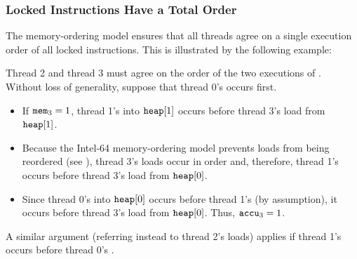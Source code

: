 \newpage

\subsubsection*{Locked Instructions Have a Total Order}

The memory-ordering model ensures that all threads agree on a single execution order of all locked instructions.
This is illustrated by the following example:

\begin{table}[!hbt]
\noindent{}
\caption[Locked Instructions Have a Total Order]{Locked Instructions Have a Total Order \cite[Example 8-8]{ref:Intel}}
\label{tbl:litmus:intel:8}
\end{table}

\noindent
Thread 2 and thread 3 must agree on the order of the two executions of .
Without loss of generality, suppose that thread 0’s  occurs first.
\begin{itemize}
  \item If $\texttt{mem}_3 = 1$, thread 1’s  into $\texttt{heap}[1]$ occurs before thread 3’s load from $\texttt{heap}[1]$.
  \item Because the Intel-64 memory-ordering model prevents loads from being reordered (see \cite[Section 8.2.3.2]{ref:Intel}), thread 3’s loads occur in order and, therefore, thread 1’s  occurs before thread 3’s load from $\texttt{heap}[0]$.
  \item Since thread 0’s  into $\texttt{heap}[0]$ occurs before thread 1’s  (by assumption), it occurs before thread 3’s load from $\texttt{heap}[0]$.
  Thus, $\texttt{accu}_3 = 1$.
\end{itemize}
A similar argument (referring instead to thread 2’s loads) applies if thread 1’s  occurs before thread 0’s .

